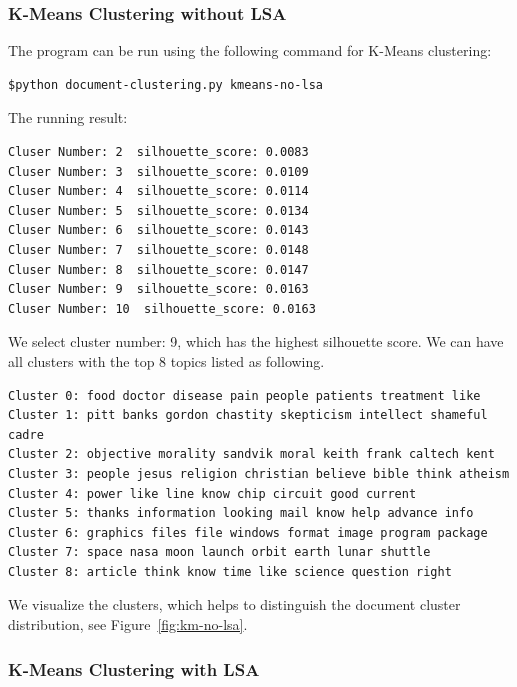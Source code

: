 \documentclass[12pt]{article}
\begin{document}
\subsubsection{K-Means Clustering without LSA}

The program can be run using the following command for K-Means clustering:
\begin{lstlisting}[frame=none]
$python document-clustering.py kmeans-no-lsa
\end{lstlisting}
The running result:
\begin{lstlisting}[frame=single, captionpos=b, caption= Silhouette Score List, label=listing:sparql_getallindividuals,]
Cluser Number: 2  silhouette_score: 0.0083
Cluser Number: 3  silhouette_score: 0.0109
Cluser Number: 4  silhouette_score: 0.0114
Cluser Number: 5  silhouette_score: 0.0134
Cluser Number: 6  silhouette_score: 0.0143
Cluser Number: 7  silhouette_score: 0.0148
Cluser Number: 8  silhouette_score: 0.0147
Cluser Number: 9  silhouette_score: 0.0163
Cluser Number: 10  silhouette_score: 0.0163
\end{lstlisting}
We select cluster number: 9, which has the highest silhouette score. We can have all clusters with the top 8 topics listed as following.
\begin{lstlisting}[frame=single, captionpos=b, caption=No LSA Cluster Result, label=listing:sparql_getallindividuals,]
Cluster 0: food doctor disease pain people patients treatment like
Cluster 1: pitt banks gordon chastity skepticism intellect shameful cadre
Cluster 2: objective morality sandvik moral keith frank caltech kent
Cluster 3: people jesus religion christian believe bible think atheism
Cluster 4: power like line know chip circuit good current
Cluster 5: thanks information looking mail know help advance info
Cluster 6: graphics files file windows format image program package
Cluster 7: space nasa moon launch orbit earth lunar shuttle
Cluster 8: article think know time like science question right
\end{lstlisting}
We visualize the clusters, which helps to distinguish the document cluster distribution, see Figure~\ref{fig:km-no-lsa}.
%	

\subsubsection{K-Means Clustering with LSA}
%	
\end{document}

